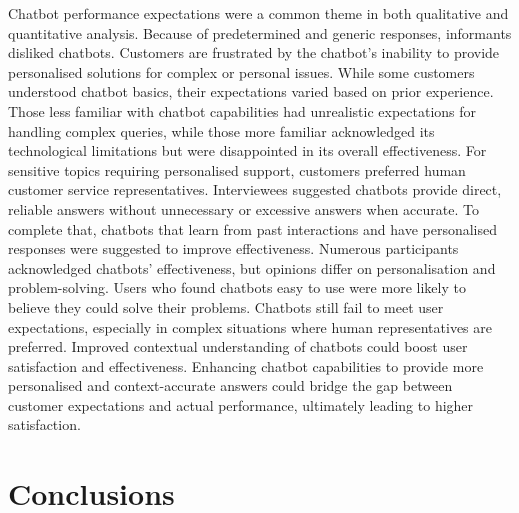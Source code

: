 \documentclass[a4paper]{article}
\begin{document}
Chatbot performance expectations were a common theme in both qualitative and quantitative analysis. Because of predetermined and generic responses, informants disliked chatbots. Customers are frustrated by the chatbot's inability to provide personalised solutions for complex or personal issues. While some customers understood chatbot basics, their expectations varied based on prior experience. Those less familiar with chatbot capabilities had unrealistic expectations for handling complex queries, while those more familiar acknowledged its technological limitations but were disappointed in its overall effectiveness.
For sensitive topics requiring personalised support, customers preferred human customer service representatives. Interviewees suggested chatbots provide direct, reliable answers without unnecessary or excessive answers when accurate. To complete that, chatbots that learn from past interactions and have personalised responses were suggested to improve effectiveness.
Numerous participants acknowledged chatbots' effectiveness, but opinions differ on personalisation and problem-solving. Users who found chatbots easy to use were more likely to believe they could solve their problems. Chatbots still fail to meet user expectations, especially in complex situations where human representatives are preferred.
Improved contextual understanding of chatbots could boost user satisfaction and effectiveness. Enhancing chatbot capabilities to provide more personalised and context-accurate answers could bridge the gap between customer expectations and actual performance, ultimately leading to higher satisfaction.

\section{Conclusions}
\end{document}
